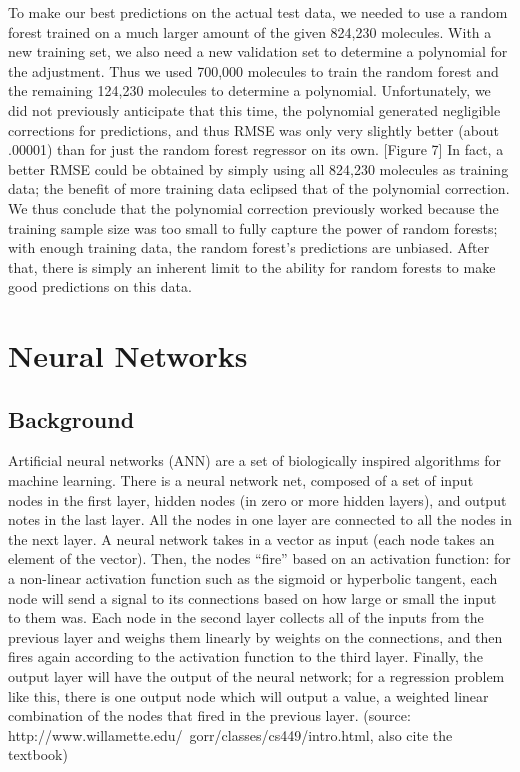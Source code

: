 \documentclass{article}
\begin{document}
To make our best predictions on the actual test data, we needed to use a random forest trained on a much larger amount of the given 824,230 molecules. With a new training set, we also need a new validation set to determine a polynomial for the adjustment. Thus we used 700,000 molecules to train the random forest and the remaining 124,230 molecules to determine a polynomial. Unfortunately, we did not previously anticipate that this time, the polynomial generated negligible corrections for predictions, and thus RMSE was only very slightly better (about .00001) than for just the random forest regressor on its own. [Figure 7] In fact, a better RMSE could be obtained by simply using all 824,230 molecules as training data; the benefit of more training data eclipsed that of the polynomial correction. We thus conclude that the polynomial correction previously worked because the training sample size was too small to fully capture the power of random forests; with enough training data, the random forest's predictions are unbiased. After that, there is simply an inherent limit to the ability for random forests to make good predictions on this data.



\section{Neural Networks}

\subsection{Background}

Artificial neural networks (ANN) are a set of biologically inspired algorithms
for machine learning.  There is a neural network net, composed of a set of input
 nodes in the first layer, hidden nodes (in zero or more hidden layers), and output
  notes in the last layer. All the nodes in one layer are connected to all the nodes 
  in the next layer.  A neural network takes in a vector as input (each node takes an 
  element of the vector).  Then, the nodes “fire” based on an activation function: 
  for a non-linear activation function such as the sigmoid or hyperbolic tangent, 
  each node will send a signal to its connections based on how large or small the 
  input to them was.  Each node in the second layer collects all of the inputs from 
  the previous layer and weighs them linearly by weights on the connections, and then
   fires again according to the activation function to the third layer.  Finally, 
   the output layer will have the output of the neural network; for a regression 
   problem like this, there is one output node which will output a value, a 
   weighted linear combination of the nodes that fired in the previous layer.
(source: http://www.willamette.edu/~gorr/classes/cs449/intro.html, also cite the textbook)
\end{document}
